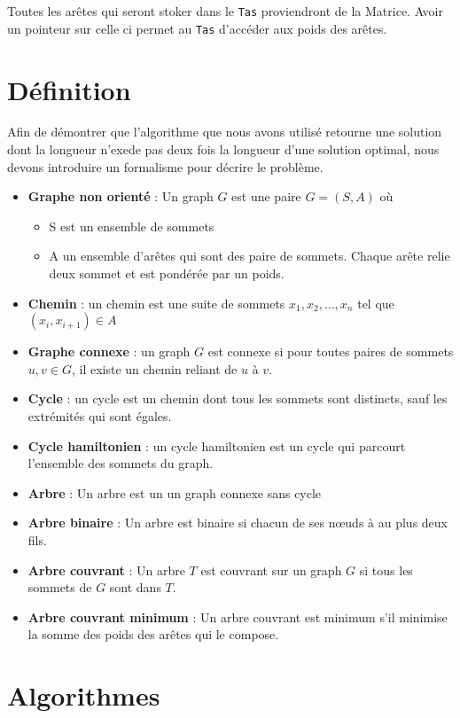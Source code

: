 \documentclass[a4paper,11pt]{article}
\begin{document}
Toutes les arêtes qui seront stoker dans le \texttt{Tas} proviendront de la Matrice. Avoir un pointeur sur celle ci permet au \texttt{Tas} d'accéder aux poids des arêtes.

\section{Définition} %
Afin de démontrer que l’algorithme que nous avons utilisé retourne une solution dont la longueur n'exede pas deux fois la longueur d'une solution optimal, nous devons introduire un formalisme pour décrire le problème.
\begin{itemize}
 \item \textbf{Graphe non orienté} : Un graph $G$ est une paire $G = \left(S, A\right)$ où
 \begin{itemize}
  \item S est un ensemble de sommets
  \item A un ensemble d'arêtes qui sont des paire de sommets. Chaque arête relie deux sommet et est pondérée par un poids.
 \end{itemize}
 \item \textbf{Chemin} : un chemin est une suite de sommets $x_1, x_2, \ldots, x_n$ tel que $\left(x_i, x_{i+1}\right) \in A$
  \item \textbf{Graphe connexe} : un graph $G$ est connexe si pour toutes paires de sommets $u, v \in G$, il existe un chemin reliant de $u$ à $v$.
 \item \textbf{Cycle} : un cycle est un chemin dont tous les sommets sont distincts, sauf les extrémités qui sont égales.
 \item \textbf{Cycle hamiltonien} : un cycle hamiltonien est un cycle qui parcourt l'ensemble des sommets du graph.
 \item \textbf{Arbre} : Un arbre est un un graph connexe sans cycle
  \item \textbf{Arbre binaire} : Un arbre est binaire si chacun de ses nœuds à au plus deux fils.
 \item \textbf{Arbre couvrant} : Un arbre $T$ est couvrant sur un graph $G$ si tous les sommets de $G$ sont dans $T$.
  \item \textbf{Arbre couvrant minimum} : Un arbre couvrant est minimum s'il minimise la somme des poids des arêtes qui le compose.
\end{itemize}

\section{Algorithmes}
\end{document}
